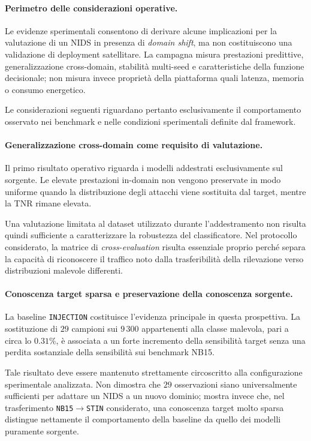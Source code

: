 \paragraph{Perimetro delle considerazioni operative.}
Le evidenze sperimentali consentono di derivare alcune implicazioni per la valutazione di un NIDS in presenza di \textit{domain shift}, ma non costituiscono una validazione di deployment satellitare. 
La campagna misura prestazioni predittive, generalizzazione cross-domain, stabilità multi-seed e caratteristiche della funzione decisionale; non misura invece proprietà della piattaforma quali latenza, memoria o consumo energetico.

Le considerazioni seguenti riguardano pertanto esclusivamente il comportamento osservato nei benchmark e nelle condizioni sperimentali definite dal framework.

\paragraph{Generalizzazione cross-domain come requisito di valutazione.}
Il primo risultato operativo riguarda i modelli addestrati esclusivamente sul sorgente. 
Le elevate prestazioni in-domain non vengono preservate in modo uniforme quando la distribuzione degli attacchi viene sostituita dal target, mentre la TNR rimane elevata.

Una valutazione limitata al dataset utilizzato durante l'addestramento non risulta quindi sufficiente a caratterizzare la robustezza del classificatore.
Nel protocollo considerato, la matrice di \textit{cross-evaluation} risulta essenziale proprio perché separa la capacità di riconoscere il traffico noto dalla trasferibilità della rilevazione verso distribuzioni malevole differenti.

\paragraph{Conoscenza target sparsa e preservazione della conoscenza sorgente.}
La baseline \texttt{INJECTION} costituisce l'evidenza principale in questa prospettiva. 
La sostituzione di $29$ campioni sui $9\,300$ appartenenti alla classe malevola, pari a circa lo $0.31\%$, è associata a un forte incremento della sensibilità target senza una perdita sostanziale della sensibilità sui benchmark NB15.

Tale risultato deve essere mantenuto strettamente circoscritto alla configurazione sperimentale analizzata. 
Non dimostra che $29$ osservazioni siano universalmente sufficienti per adattare un NIDS a un nuovo dominio; mostra invece che, nel trasferimento \texttt{NB15}$\rightarrow$\texttt{STIN} considerato, una conoscenza target molto sparsa distingue nettamente il comportamento della baseline da quello dei modelli puramente sorgente.

